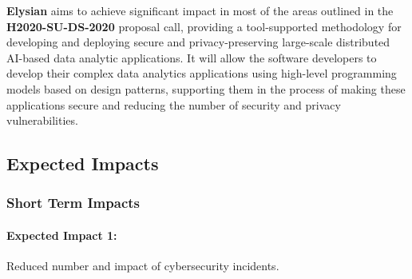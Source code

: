 \documentclass[a4paper,11pt]{article}
\newcommand{\project}[1]{\textbf{#1}\xspace}
\newcommand{\SECURITY}{\project{Elysian}}
\newcommand{\TheProject}{\SECURITY}
\begin{document}

\TheProject{} aims to achieve significant impact in most of the areas outlined in the \textbf{H2020-SU-DS-2020} proposal call, providing a tool-supported methodology for developing and deploying secure and privacy-preserving large-scale distributed AI-based data analytic applications. It will allow the software developers to develop their complex data analytics applications using high-level programming models based on design patterns, supporting them in the process of making these applications secure and reducing the number of security and privacy vulnerabilities.  

\subsection{Expected Impacts}
\label{sect:expectedImpacts}

\subsubsection{Short Term Impacts}

\begin{mdframed}[backgroundcolor=blue!5]
\paragraph{Expected Impact 1:}
Reduced number and impact of cybersecurity incidents.
\end{mdframed}
\end{document}
